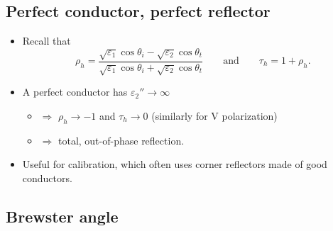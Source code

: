 \documentclass[11pt, oneside]{article}
\begin{document}
\subsection{Perfect conductor, perfect reflector}

\begin{itemize}
	\item Recall that
	\begin{equation}
		\rho_h = \frac{\sqrt{\varepsilon_1}\cos\theta_i - \sqrt{\varepsilon_2}\cos\theta_t}{\sqrt{\varepsilon_1}\cos\theta_i + \sqrt{\varepsilon_2}\cos\theta_t}
		\qquad \text{and} \qquad
		\tau_h = 1 + \rho_h.
	\end{equation}
	\item A perfect conductor has $\varepsilon_2'' \rightarrow \infty$
	\begin{itemize}
		\item[] $\Rightarrow$ $\rho_h \rightarrow -1$ and $\tau_h \rightarrow 0$ (similarly for V polarization)
		\item[] $\Rightarrow$ total, out-of-phase reflection.
	\end{itemize}
	\item Useful for calibration, which often uses corner reflectors made of good conductors.
\end{itemize}

\subsection{Brewster angle}
\end{document}
